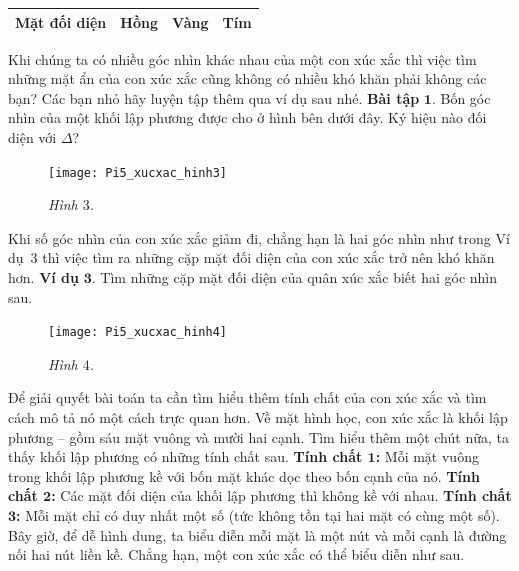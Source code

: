 \begin{multicols}{2}
\begin{table}[H]
\begin{tabular}{|l|c|c|c|}
			\hline
			Mặt đối diện&	{\color{toancuabi}Hồng}	&{\color{yellow}Vàng}&	{\color{gocco}Tím}\\
			\hline
		\end{tabular}
		\vspace*{-5pt}
	\end{table}
	Khi chúng ta có nhiều góc nhìn khác nhau của một con xúc xắc thì việc tìm những mặt ẩn của con xúc xắc cũng không có nhiều khó khăn phải không các bạn? Các bạn nhỏ hãy luyện tập thêm qua ví dụ sau nhé.
	\vskip 0.1cm
	\textbf{\color{toancuabi}Bài tập} $\pmb{1.}$ Bốn góc nhìn của một khối lập phương được cho ở hình bên dưới đây. Ký hiệu nào đối diện với $\Delta$?
	\begin{figure}[H]
		\vspace*{-5pt}
		\centering
		\captionsetup{labelformat= empty, justification=centering}
		\texttt{[image: Pi5\_xucxac\_hinh3]}
		\caption{\small\textit{\color{toancuabi}Hình $3$.}}
		\vspace*{-10pt}
	\end{figure}
	Khi số góc nhìn của con xúc xắc giảm đi, chẳng hạn là hai góc nhìn như trong Ví dụ~$3$ thì việc tìm ra những cặp mặt đối diện của con xúc xắc trở nên khó khăn hơn. 
	\vskip 0.1cm
	\textbf{\color{toancuabi}Ví dụ} $\pmb{3.}$ Tìm những cặp mặt đối diện của quân xúc xắc biết hai góc nhìn sau.
	\begin{figure}[H]
		\vspace*{5pt}
		\centering
		\captionsetup{labelformat= empty, justification=centering}
		\texttt{[image: Pi5\_xucxac\_hinh4]}
		\caption{\small\textit{\color{toancuabi}Hình $4$.}}
		\vspace*{-10pt}
	\end{figure}
	Để giải quyết bài toán ta cần tìm hiểu thêm tính chất của con xúc xắc và tìm cách mô tả nó một cách trực quan hơn. Về mặt hình học, con xúc xắc là khối lập phương -- gồm sáu mặt vuông và mười hai cạnh.  Tìm hiểu thêm một chút nữa, ta thấy khối lập phương có những tính chất sau.
	\vskip 0.1cm
	\textbf{\color{toancuabi}Tính chất $\pmb{1}$:} Mỗi mặt vuông trong khối lập phương kề với bốn mặt khác dọc theo bốn cạnh của nó.   
	\vskip 0.1cm
	\textbf{\color{toancuabi}Tính chất $\pmb{2}$:} Các mặt đối diện của khối lập phương thì không kề với nhau. 
	\vskip 0.1cm
	\textbf{\color{toancuabi}Tính chất $\pmb{3}$:} Mỗi mặt chỉ có duy nhất một số (tức không tồn tại hai mặt có cùng một số).
	\vskip 0.1cm
	Bây giờ, để dễ hình dung, ta biểu diễn mỗi mặt là một nút và mỗi cạnh là đường nối hai nút liền kề. Chẳng hạn, một con xúc xắc có thể biểu diễn như sau.

\end{multicols}
